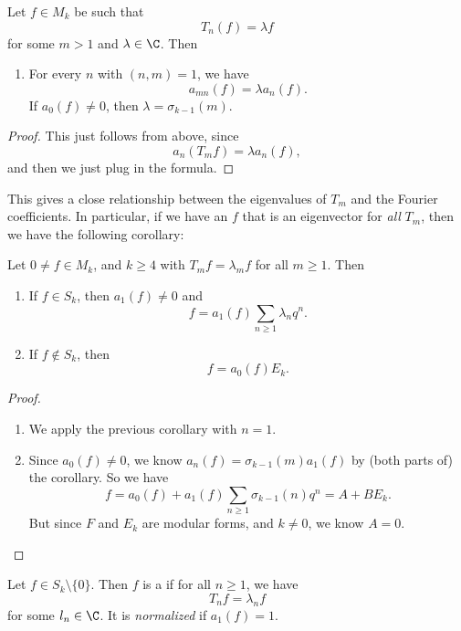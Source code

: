 \documentclass[a4paper]{article}
\begin{document}
\begin{cor}
  Let $f \in M_k$ be such that
  \[
    T_n(f) = \lambda f
  \]
  for some $m > 1$ and $\lambda \in \C$. Then
  \begin{enumerate}
    \item For every $n$ with $(n, m) = 1$, we have
      \[
        a_{mn}(f) = \lambda a_n(f).
      \]
      If $a_0(f) \not= 0$, then $\lambda = \sigma_{k - 1}(m)$.
  \end{enumerate}
\end{cor}

\begin{proof}
  This just follows from above, since
  \[
    a_n(T_m f) = \lambda a_n(f),
  \]
  and then we just plug in the formula.
\end{proof}
This gives a close relationship between the eigenvalues of $T_m$ and the Fourier coefficients. In particular, if we have an $f$ that is an eigenvector for \emph{all} $T_m$, then we have the following corollary:
\begin{cor}
  Let $0 \not= f \in M_k$, and $k \geq 4$ with $T_m f = \lambda_m f$ for all $m \geq 1$. Then
  \begin{enumerate}
    \item If $f \in S_k$, then $a_1(f) \not= 0$ and
      \[
        f = a_1(f) \sum_{n \geq 1} \lambda_n q^n.
      \]
    \item If $f \not \in S_k$, then
      \[
        f = a_0 (f) E_k.
      \]
  \end{enumerate}
\end{cor}

\begin{proof}\leavevmode
  \begin{enumerate}
    \item We apply the previous corollary with $n = 1$.
    \item Since $a_0(f) \not= 0$, we know $a_n(f) = \sigma_{k - 1}(m) a_1(f)$ by (both parts of) the corollary. So we have
      \[
        f = a_0(f) + a_1(f) \sum_{n \geq 1} \sigma_{k - 1}(n) q^n = A + B E_k.
      \]
      But since $F$ and $E_k$ are modular forms, and $k \not= 0$, we know $A = 0$.
  \end{enumerate}
\end{proof}

\begin{defi}
  Let $f \in S_k \setminus \{0\}$. Then $f$ is a  if for all $n \geq 1$, we have
  \[
    T_n f = \lambda_n f
  \]
  for some $l_n \in \C$. It is \emph{normalized} if $a_1(f) = 1$.
\end{defi}
\end{document}
